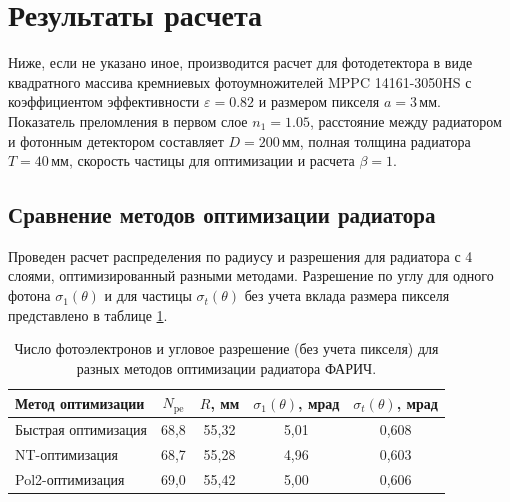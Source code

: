 \documentclass[12pt]{article}
\begin{document}
\section{Результаты расчета}
Ниже, если не указано иное, производится расчет для фотодетектора в виде квадратного массива кремниевых фотоумножителей 
MPPC 14161-3050HS с коэффициентом эффективности $\varepsilon=0.82$ и размером пикселя $a=3$\,мм. 
Показатель преломления в первом слое $n_1=1.05$, расстояние между радиатором и фотонным детектором составляет $D=200$\,мм, полная толщина радиатора $T=40$\,мм, 
скорость частицы для оптимизации и расчета $\beta=1$.

\subsection{Сравнение методов оптимизации радиатора}
Проведен расчет распределения по радиусу и разрешения для радиатора с 4 слоями, оптимизированный разными методами. Разрешение по углу для одного фотона 
$\sigma_1(\theta)$ и для частицы $\sigma_t(\theta)$ без учета вклада размера пикселя представлено в таблице \ref{tab:methcomp}. 

\begin{table}[htbp]
\caption{Число фотоэлектронов и угловое разрешение (без учета пикселя) для разных методов оптимизации радиатора ФАРИЧ.}
\label{tab:methcomp}
\begin{center}
\begin{tabular}{lcccc}\hline
Метод оптимизации   & $N_\mathrm{pe}$ & $R$, мм & $\sigma_1(\theta)$, мрад & $\sigma_t(\theta)$, мрад \\\hline
Быстрая оптимизация & 68,8 & 55,32 & 5,01 & 0,608 \\\hline
NT-оптимизация      & 68,7 & 55,28 & 4,96 & 0,603 \\\hline
Pol2-оптимизация    & 69,0 & 55,42 & 5,00 & 0,606 \\\hline
\end{tabular}
\end{center}
\end{table}
\end{document}
